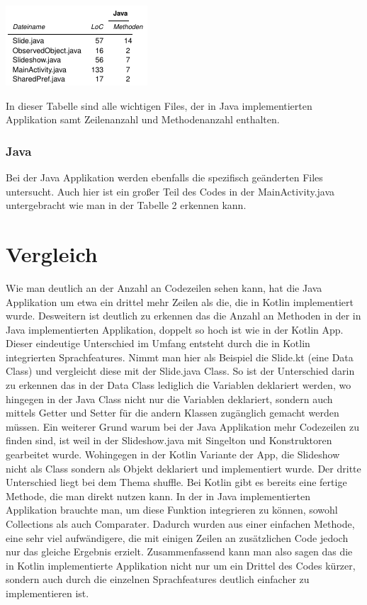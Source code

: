 \documentclass{sigchi-ext}
\begin{document}
\begin{marginfigure}[-15pc]
  \begin{minipage}{\marginparwidth}
    \centering
    \includegraphics[width=1.05\marginparwidth]{figures/Java-Tabelle.png}
    \caption{In dieser Tabelle sind alle wichtigen Files, der in Java implementierten Applikation samt Zeilenanzahl und Methodenanzahl enthalten.}
  \end{minipage}
\end{marginfigure}

\subsubsection{Java}
Bei der Java Applikation werden ebenfalls die spezifisch geänderten Files untersucht. Auch hier ist ein großer Teil des Codes in der MainActivity.java untergebracht wie man in der Tabelle 2 erkennen kann.

\section{Vergleich}
Wie man deutlich an der Anzahl an Codezeilen sehen kann, hat die Java Applikation um etwa ein drittel mehr Zeilen als die, die in Kotlin implementiert wurde. Desweitern ist deutlich zu erkennen das die Anzahl an Methoden in der in Java implementierten Applikation, doppelt so hoch ist wie in der Kotlin App.
Dieser eindeutige Unterschied im Umfang entsteht durch die in Kotlin integrierten Sprachfeatures. Nimmt man hier als Beispiel die Slide.kt (eine Data Class) und vergleicht diese mit der Slide.java Class. So ist der Unterschied darin zu erkennen das in der Data Class lediglich die Variablen deklariert werden, wo hingegen in der Java Class nicht nur die Variablen deklariert, sondern auch mittels Getter und Setter für die andern Klassen zugänglich gemacht werden müssen.
Ein weiterer Grund warum bei der Java Applikation mehr Codezeilen zu finden sind, ist weil in der Slideshow.java mit Singelton und Konstruktoren gearbeitet wurde. Wohingegen in der Kotlin Variante der App, die Slideshow nicht als Class sondern als Objekt deklariert und implementiert wurde.
Der dritte Unterschied liegt bei dem Thema shuffle. Bei Kotlin gibt es bereits eine fertige Methode, die man direkt nutzen kann. In der in Java implementierten Applikation brauchte man, um diese Funktion integrieren zu können, sowohl Collections als auch Comparater. Dadurch wurden aus einer einfachen Methode, eine sehr viel aufwändigere, die mit einigen Zeilen an zusätzlichen Code jedoch nur das gleiche Ergebnis erzielt.
Zusammenfassend kann man also sagen das die in Kotlin implementierte Applikation nicht nur um ein Drittel des Codes kürzer, sondern auch durch die einzelnen Sprachfeatures deutlich einfacher zu implementieren ist.


\balance{} 



\end{document}
